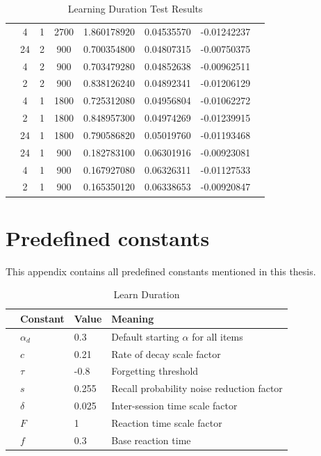 \documentclass[a4paper]{report}
\begin{document}
\begin{table}[h]
{\begin{tabular}{l*{7}{c}}
         & 4            &     1         &     2700         & 1.860178920         &  0.04535570 & -0.01242237 \\
         & 24           &     2         &     900          & 0.700354800         &  0.04807315 & -0.00750375 \\
         & 4            &     2         &     900          & 0.703479280         &  0.04852638 & -0.00962511 \\
         & 2            &     2         &     900          & 0.838126240         &  0.04892341 & -0.01206129 \\
         & 4            &     1         &     1800         & 0.725312080         &  0.04956804 & -0.01062272 \\
         & 2            &     1         &     1800         & 0.848957300         &  0.04974269 & -0.01239915 \\
         & 24           &     1         &     1800         & 0.790586820         &  0.05019760 & -0.01193468 \\
         & 24           &     1         &     900          & 0.182783100         &  0.06301916 & -0.00923081 \\
         & 4            &     1         &     900          & 0.167927080         &  0.06326311 & -0.01127533 \\
         & 2            &     1         &     900          & 0.165350120         &  0.06338653 & -0.00920847 \\
		\bottomrule
	\end{tabular}
	}
	\caption{Learning Duration Test Results}
	\label{tab:learn_dur}
\end{table}


\chapter{Predefined constants}
\label{app:constants}
This appendix contains all predefined constants mentioned in this thesis.
\begin{table}[h]
	\centering\small
	\begin{tabular}{c*{3}{l}}
		\toprule
		& Constant         & Value  & Meaning \\
		\midrule
		 & $\alpha_d$  &  0.3       & Default starting $\alpha$ for all items \\
		 & $c$             &  0.21  & Rate of decay scale factor \\
		 & $\tau$          & -0.8   & Forgetting threshold \\
		 & $s$             &  0.255 & Recall probability noise reduction factor \\
		 & $\delta$        &  0.025 & Inter-session time scale factor \\
		 & $F$             &  1     & Reaction time scale factor \\
		 & $f$             &  0.3   & Base reaction time \\
		\bottomrule
	\end{tabular}
	\caption{Learn Duration}
	\label{tab:learn-duration}
\end{table}




\end{document}
